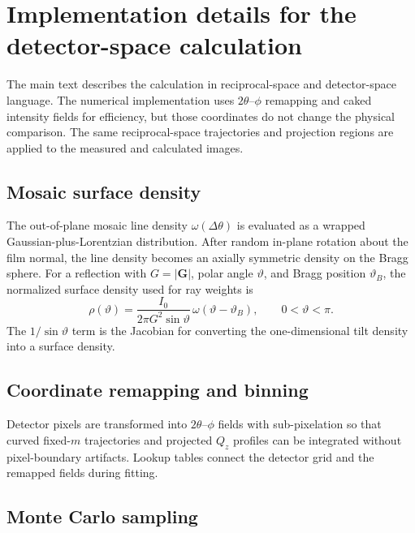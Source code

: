
\section{Implementation details for the detector-space calculation}

The main text describes the calculation in reciprocal-space and detector-space language. The numerical implementation uses $2\theta$--$\phi$ remapping and caked intensity fields for efficiency, but those coordinates do not change the physical comparison. The same reciprocal-space trajectories and projection regions are applied to the measured and calculated images.

\subsection{Mosaic surface density}

The out-of-plane mosaic line density $\omega(\Delta\theta)$ is evaluated as a wrapped Gaussian-plus-Lorentzian distribution. After random in-plane rotation about the film normal, the line density becomes an axially symmetric density on the Bragg sphere. For a reflection with $G=|\mathbf G|$, polar angle $\vartheta$, and Bragg position $\vartheta_B$, the normalized surface density used for ray weights is
\begin{equation}
\rho(\vartheta)=\frac{I_0}{2\pi G^2\sin\vartheta}\,\omega(\vartheta-\vartheta_B),\qquad 0<\vartheta<\pi.
\end{equation}
The $1/\sin\vartheta$ term is the Jacobian for converting the one-dimensional tilt density into a surface density.

\subsection{Coordinate remapping and binning}

Detector pixels are transformed into $2\theta$--$\phi$ fields with sub-pixelation so that curved fixed-$m$ trajectories and projected $Q_z$ profiles can be integrated without pixel-boundary artifacts. Lookup tables connect the detector grid and the remapped fields during fitting.

\subsection{Monte Carlo sampling}

